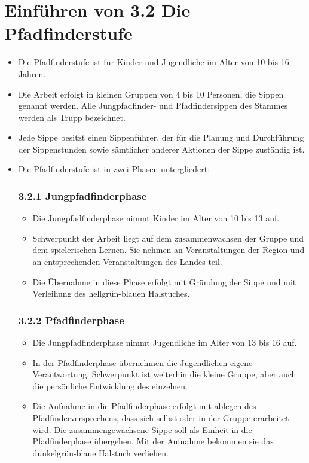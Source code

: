 \documentclass[a4paper]{article}
\begin{document}
\section{Einführen von 3.2 Die Pfadfinderstufe} %
\label{sec:anpassung_der_ordnung_auf_die_neue_beauftragung}
    \label{sub:die_pfadfinderstufe}
    \begin{itemize}
        \item Die Pfadfinderstufe ist für Kinder und Jugendliche im Alter von 10 bis 16 Jahren. 
        \item Die Arbeit erfolgt in kleinen Gruppen von 4 bis 10 Personen, die Sippen genannt werden. Alle Jungpfadfinder- und Pfadfindersippen des Stammes werden als Trupp bezeichnet.
        \item Jede Sippe besitzt einen Sippenführer, der für die Planung und Durchführung der Sippenstunden sowie sämtlicher anderer Aktionen der Sippe zuständig ist. 
        \item Die Pfadfinderstufe ist in zwei Phasen untergliedert:
        \subsubsection*{3.2.1 Jungpfadfinderphase} %
        \label{ssub:jungpfadfinderphase}
            \begin{itemize}
                \item Die Jungpfadfinderphase nimmt Kinder im Alter von 10 bis 13 auf.
                \item Schwerpunkt der Arbeit liegt auf dem zusammenwachsen der Gruppe und dem spielerischen Lernen. Sie nehmen an Veranstaltungen der Region und an entsprechenden Veranstaltungen des Landes teil.
                \item Die Übernahme in diese Phase erfolgt mit Gründung der Sippe und mit Verleihung des hellgrün-blauen Halstuches.
            \end{itemize}
        \subsubsection*{3.2.2 Pfadfinderphase} %
        \label{ssub:pfadfinderphase}
        \begin{itemize}
            \item Die Jungpfadfinderphase nimmt Jugendliche im Alter von 13 bis 16 auf.
            \item In der Pfadfinderphase übernehmen die Jugendlichen eigene Verantwortung. Schwerpunkt ist weiterhin die kleine Gruppe, aber auch die persönliche Entwicklung des einzelnen. 
            \item Die Aufnahme in die Pfadfinderphase erfolgt mit ablegen des Pfadfinderversprechens, dass sich selbst oder in der Gruppe erarbeitet wird. Die zusammengewachsene Sippe soll als Einheit in die Pfadfinderphase übergehen. Mit der Aufnahme bekommen sie das dunkelgrün-blaue Halstuch verliehen. 
        \end{itemize}
    \end{itemize}
\end{document}
